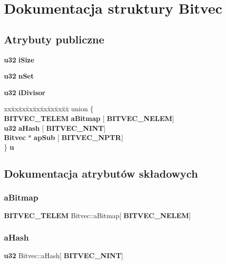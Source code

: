 \section{Dokumentacja struktury Bitvec}
\label{struct_bitvec}
\subsection*{Atrybuty publiczne}
\begin{DoxyCompactItemize}
\item 
\textbf{ u32} \textbf{ i\+Size}
\item 
\textbf{ u32} \textbf{ n\+Set}
\item 
\textbf{ u32} \textbf{ i\+Divisor}
\item 
\begin{tabbing}
xx\=xx\=xx\=xx\=xx\=xx\=xx\=xx\=xx\=\kill
union \{\\
\>\textbf{ BITVEC\_TELEM} \textbf{ aBitmap} [\textbf{ BITVEC\_NELEM}]\\
\>\textbf{ u32} \textbf{ aHash} [\textbf{ BITVEC\_NINT}]\\
\>\textbf{ Bitvec} $\ast$ \textbf{ apSub} [\textbf{ BITVEC\_NPTR}]\\
\} \textbf{ u}\\

\end{tabbing}\end{DoxyCompactItemize}


\subsection{Dokumentacja atrybutów składowych}
\mbox{\label{struct_bitvec_ad0c8d2bbafe74c346a007004086fb56d}} 
\subsubsection{aBitmap}
{\footnotesize\ttfamily \textbf{ B\+I\+T\+V\+E\+C\+\_\+\+T\+E\+L\+EM} Bitvec\+::a\+Bitmap[\textbf{ B\+I\+T\+V\+E\+C\+\_\+\+N\+E\+L\+EM}]}

\mbox{\label{struct_bitvec_adcaa47179c109270041bf59f8fe9f8ff}} 
\subsubsection{aHash}
{\footnotesize\ttfamily \textbf{ u32} Bitvec\+::a\+Hash[\textbf{ B\+I\+T\+V\+E\+C\+\_\+\+N\+I\+NT}]}

